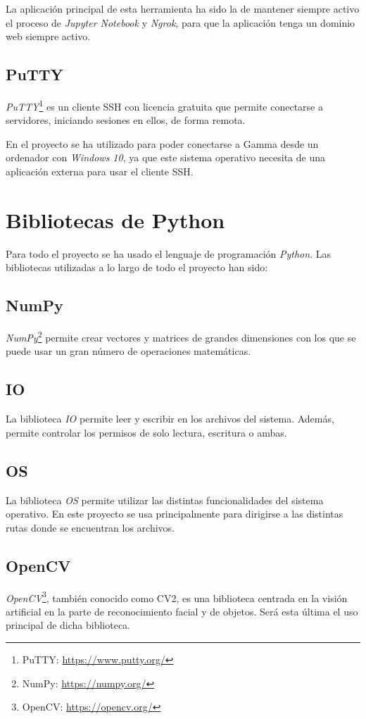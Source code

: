 La aplicación principal de esta herramienta ha sido la de mantener siempre activo el proceso de \emph{Jupyter Notebook} y \emph{Ngrok}, para que la aplicación tenga un dominio web siempre activo.

\subsection{PuTTY}
\emph{PuTTY}\footnote{PuTTY: \url{https://www.putty.org/}} es un cliente SSH con licencia gratuita que permite conectarse a servidores, iniciando sesiones en ellos, de forma remota. 

En el proyecto se ha utilizado para poder conectarse a Gamma desde un ordenador con \emph{Windows 10}, ya que este sistema operativo necesita de una aplicación externa para usar el cliente SSH. 

\section{Bibliotecas de Python}
Para todo el proyecto se ha usado el lenguaje de programación \emph{Python}. Las bibliotecas utilizadas a lo largo de todo el proyecto han sido:

\subsection{NumPy}
\emph{NumPy}\footnote{NumPy: \url{https://numpy.org/}} permite crear vectores y matrices de grandes dimensiones con los que se puede usar un gran número de operaciones matemáticas.

\subsection{IO}
La biblioteca \emph{IO} permite leer y escribir en los archivos del sistema. Además, permite controlar los permisos de solo lectura, escritura o ambas.

\subsection{OS}
La biblioteca \emph{OS} permite utilizar las distintas funcionalidades del sistema operativo. En este proyecto se usa principalmente para dirigirse a las distintas rutas donde se encuentran los archivos. 

\subsection{OpenCV}
\emph{OpenCV}\footnote{OpenCV: \url{https://opencv.org/}}, también conocido como CV2, es una biblioteca centrada en la visión artificial en la parte de reconocimiento facial y de objetos. Será esta última el uso principal de dicha biblioteca.

